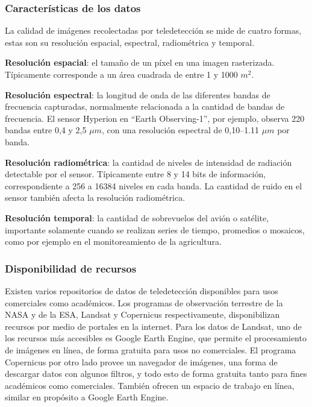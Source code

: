 \subsubsection{Características de los datos}

La calidad de imágenes recolectadas por teledetección se mide de cuatro formas, estas son su resolución espacial,
espectral, radiométrica y temporal.

{\bf Resolución espacial}: el tamaño de un píxel en una imagen rasterizada. Típicamente corresponde a un área cuadrada
de entre 1 y 1000 $m^2$.

{\bf Resolución espectral}: la longitud de onda de las diferentes bandas de frecuencia capturadas, normalmente
relacionada a la cantidad de bandas de frecuencia. El sensor Hyperion en \enquote{Earth Observing-1}, por ejemplo, observa 220
bandas entre 0,4 y 2,5 $\mu m$, con una resolución espectral de 0,10--1.11 $\mu m$ por banda.
\autocite{earth-observatory-earth-observing-1}

{\bf Resolución radiométrica}: la cantidad de niveles de intensidad de radiación detectable por el sensor. Típicamente
entre 8 y 14 bits de información, correspondiente a 256 a 16384 niveles en cada banda. La cantidad de ruido en el
sensor también afecta la resolución radiométrica.

{\bf Resolución temporal}: la cantidad de sobrevuelos del avión o satélite, importante solamente cuando se realizan
series de tiempo, promedios o mosaicos, como por ejemplo en el monitoreamiento de la agricultura.


\subsubsection{Disponibilidad de recursos}

Existen varios repositorios de datos de teledetección disponibles para usos comerciales como académicos. Los programas
de observación terrestre de la NASA y de la ESA, Landsat y Copernicus respectivamente, disponibilizan recursos por
medio de portales en la internet. Para los datos de Landsat, uno de los recursos más accesibles es Google Earth Engine,
que permite el procesamiento de imágenes en línea, de forma gratuita para usos no comerciales.
\autocite{landsat-data-access} El programa Copernicus por otro lado provee un navegador de imágenes, una forma de
descargar datos con algunos filtros, y todo esto de forma gratuita tanto para fines académicos como comerciales.
\autocite{copernicus-licences} También ofrecen un espacio de trabajo en línea, similar en propósito a Google Earth
Engine. \autocite{copernicus-ds-about}
